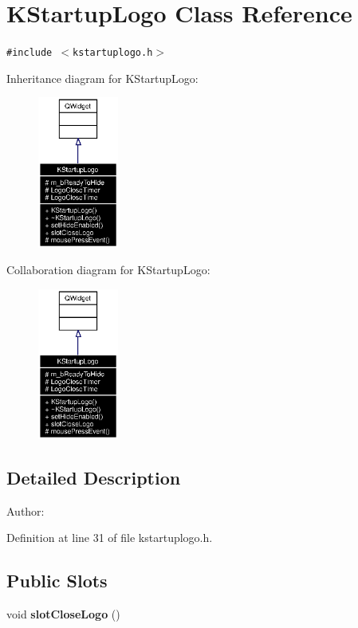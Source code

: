 \section{KStartup\-Logo Class Reference}
\label{classKStartupLogo}
{\tt \#include $<$kstartuplogo.h$>$}

Inheritance diagram for KStartup\-Logo:\begin{figure}[H]
\begin{center}
\leavevmode
\includegraphics[width=75pt]{classKStartupLogo__inherit__graph}
\end{center}
\end{figure}
Collaboration diagram for KStartup\-Logo:\begin{figure}[H]
\begin{center}
\leavevmode
\includegraphics[width=75pt]{classKStartupLogo__coll__graph}
\end{center}
\end{figure}


\subsection{Detailed Description}
\begin{Desc}
\item[Author:]\end{Desc}




Definition at line 31 of file kstartuplogo.h.\subsection*{Public Slots}
\begin{CompactItemize}
\item 
void {\bf slot\-Close\-Logo} ()
\end{CompactItemize}
